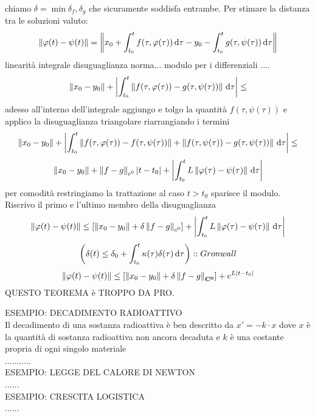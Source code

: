 	chiamo $\delta=\min{\delta_f,\delta_g}$ che sicuramente soddisfa entrambe. Per stimare la distanza tra le soluzioni valuto:
	$$
	\left\|\varphi(t)-\psi(t)\right\|=
	\left\| x_0+\int_{t_0}^t f(\tau,\varphi(\tau))\,\mathrm{d}{\tau} - y_0 - \int_{t_0}^t g(\tau,\psi(\tau))\,\mathrm{d}{\tau}\right\|
	$$
	linearità integrale disuguaglianza norma... modulo per i differenziali ....\\
	$$ \left\|x_0-y_0\right\|+\left|\int_{t_0}^{t} \left\|f(\tau,\varphi(\tau))-g(\tau,\psi(\tau))\right\|\,\mathrm{d}{\tau}\right|\le$$
	adesso all'interno dell'integrale aggiungo e tolgo la quantità $f(\tau,\psi(\tau))$ e applico la disuguaglianza triangolare riarrangiando i termini
	$$ \left\|x_0-y_0\right\|+\left|\int_{t_0}^{t} \left\|f(\tau,\varphi(\tau))-f(\tau,\psi(\tau))\right\|+\left\|f(\tau,\psi(\tau))-g(\tau,\psi(\tau))\right\|\,\mathrm{d}{\tau}\right|\le$$
	$$ \left\|x_0-y_0\right\| + \left\|f-g\right\|_{c^0}\left|t-t_0\right| +\left|\int_{t_0}^{t} L\left\|\varphi(\tau)-\psi(\tau)\right\| \,\mathrm{d}{\tau}\right|$$
	per comodità restringiamo la trattazione al caso $t>t_0$ sparisce il modulo. Riscrivo il primo e l'ultimo membro della disuguaglianza
	$$ \left\|\varphi(t)-\psi(t)\right\|\le  \left[ \left\|x_0-y_0\right\| + \delta\left\|f-g\right\|_{c^0}\right] +\left|\int_{t_0}^{t} L\left\|\varphi(\tau)-\psi(\tau)\right\| \,\mathrm{d}{\tau}\right|$$
	$$ \left( \delta(t)\le\delta_0+\int_{t_0}^t \kappa(\tau)\delta(\tau)\,\mathrm{d}{\tau} \right)::Gronwall$$
	$$ \left\|\varphi(t)-\psi(t)\right\|\le\left[\left\|x_0-y_0\right\|+\delta\left\|f-g\right\|_{\mathbf{C^{0}}}\right]+e^{L\left|t-t_0\right|}$$
	QUESTO TEOREMA è TROPPO DA PRO.

ESEMPIO: DECADIMENTO RADIOATTIVO\\
Il decadimento di una sostanza radioattiva è ben descritto da $ x'=-k\cdot x$ dove $x$ è la quantità di sostanza radioattiva non ancora decaduta e $k$ è una costante propria di ogni singolo materiale\\
...........\\
ESEMPIO: LEGGE DEL CALORE DI NEWTON\\
......\\
ESEMPIO: CRESCITA LOGISTICA\\
......\\
